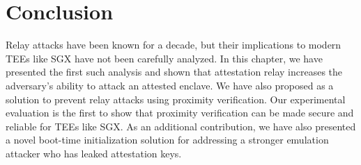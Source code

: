 \section{Conclusion}
\label{sec:conclusion_promimitee}

Relay attacks have been known for a decade, but their implications to modern TEEs like SGX have not been carefully analyzed. In this chapter, we have presented the first such analysis and shown that attestation relay increases the adversary's ability to attack an attested enclave. We have also proposed \name as a solution to prevent relay attacks using proximity verification. Our experimental evaluation is the first to show that proximity verification can be made secure and reliable for TEEs like SGX. As an additional contribution, we have also presented a novel boot-time initialization solution for addressing a stronger emulation attacker who has leaked attestation keys.